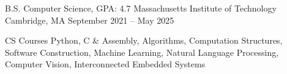 \documentclass[12pt, letterpaper]{awesome-cv}
\begin{document}
\makecvheader

\begin{cventries}
  \cventry
    {B.S. Computer Science, GPA: 4.7} %
    {Massachusetts Institute of Technology} %
    {Cambridge, MA} %
    {September 2021 -- May 2025} %
    {
      \vspace{-0.11in}
      \begin{cvskills}
        \cvskill
          {CS Courses} %
          {Python, C \& Assembly,  Algorithms, Computation Structures, Software Construction,
          \newline Machine Learning, Natural Language Processing, Computer Vision, Interconnected Embedded Systems} %
      \end{cvskills}
    }
  \vspace{-0.2in}
\end{cventries} 
\end{document}
